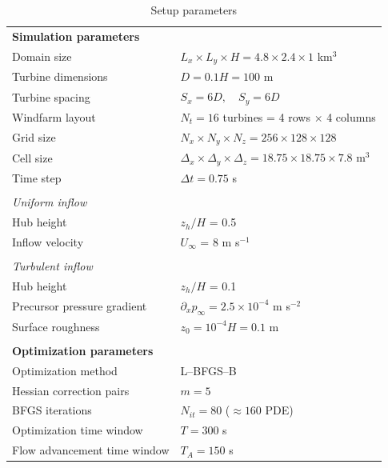 \begin{table}
	\caption{Setup parameters \label{tab:case_definition}}
	\begin{tabular}{llccc}
		\hline 
		\multicolumn{5}{l}{\textbf{Simulation parameters}}\\
		Domain size  			& \multicolumn{4}{l}{$L_x \times L_y \times H = 4.8 \times 2.4 \times 1$ km$^3$}  \\ 
		Turbine dimensions  		& \multicolumn{4}{l}{$D = 0.1H = 100$ m}\\ 
		Turbine spacing  		& \multicolumn{4}{l}{$S_x = 6D, \quad S_y = 6D$}\\
		Windfarm layout 		& \multicolumn{4}{l}{$N_t = 16 $ turbines = 4 rows $\times$ 4 columns} \\ 
		Grid size 			& \multicolumn{4}{l}{$N_x \times N_y \times N_z = 256 \times 128 \times 128$}\\
		Cell size 			& \multicolumn{4}{l}{$\Delta_x \times \Delta_y \times \Delta_z = 18.75 \times 18.75 \times 7.8$ m$^3$}\\
		Time step 			& \multicolumn{4}{l}{$\Delta t = 0.75$ s}\\		
		& & & & \\	
		\multicolumn{5}{l}{\textit{Uniform inflow}}\\
		Hub height & \multicolumn{4}{l}{$z_h/H$ = 0.5}\\
		Inflow velocity & \multicolumn{4}{l}{$U_\infty$ = 8 m s$^{-1}$}\\
		& & & & \\			
		\multicolumn{5}{l}{\textit{Turbulent inflow}}\\
		Hub height & \multicolumn{4}{l}{$z_h/H$ = 0.1}\\		
		Precursor pressure gradient  	& \multicolumn{4}{l}{$ \partial_x p_\infty = 2.5 \times 10^{-4}$ m s$^{-2}$}  \\ 
		Surface roughness  &  \multicolumn{4}{l}{$z_0 = 10^{-4}H = 0.1$ m}\\ 		
		& & & & \\	
		\multicolumn{5}{l}{\textbf{Optimization parameters}}\\
		Optimization method		& \multicolumn{4}{l}{L--BFGS--B} \\
		Hessian correction pairs	& \multicolumn{4}{l}{$m = 5$} \\
		BFGS iterations 		& \multicolumn{4}{l}{$N_{it} = 80$ ($\approx 160$ PDE)} \\
		Optimization time window	& \multicolumn{4}{l}{$T = 300$ s}\\
		Flow advancement time window 	& \multicolumn{4}{l}{$T_A = 150$ s}\\

\end{tabular}
\end{table}
